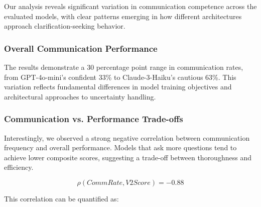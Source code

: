 \documentclass[conference]{IEEEtran}
\begin{document}
Our analysis reveals significant variation in communication competence across the evaluated models, with clear patterns emerging in how different architectures approach clarification-seeking behavior.

\subsubsection{Overall Communication Performance}

\begin{table}[ht]
\centering
\small
\caption{Communication Competence Results Across Models}
\label{tab:communication_results}
\end{table}

The results demonstrate a 30 percentage point range in communication rates, from GPT-4o-mini's confident 33\% to Claude-3-Haiku's cautious 63\%. This variation reflects fundamental differences in model training objectives and architectural approaches to uncertainty handling.

\subsubsection{Communication vs. Performance Trade-offs}

Interestingly, we observed a strong negative correlation between communication frequency and overall performance. Models that ask more questions tend to achieve lower composite scores, suggesting a trade-off between thoroughness and efficiency.

\begin{equation}
    \mathit{\rho}(\mathit{CommRate}, \mathit{V2Score}) = -0.88
\end{equation}

This correlation can be quantified as:
\end{document}
